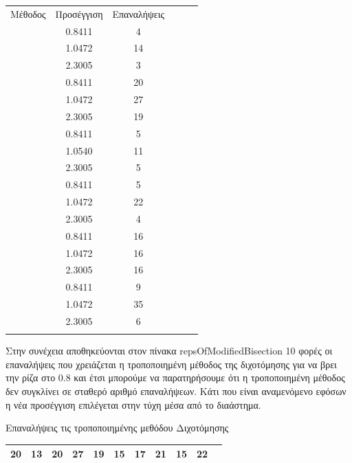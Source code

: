 \documentclass[a4paper,11pt]{article}
\begin{document}
\begin{flushleft}
\begin{center}
    \begin{tabular}{|c|c|c|c|c|c|}
        \hline
        Μέθοδος & Προσέγγιση & Επαναλήψεις\\ \Xhline{4\arrayrulewidth}
        \multirow{3}{*}{modifiedNewtonRoots} & 0.8411 & 4 \\ \cline{2-3} & 1.0472 & 14 \\ \cline{2-3} & 2.3005 & 3 \\ \Xhline{4\arrayrulewidth}
        \multirow{3}{*}{modifiedBisectionRoots} & 0.8411 & 20 \\ \cline{2-3} & 1.0472 & 27 \\ \cline{2-3} & 2.3005 & 19 \\ \Xhline{4\arrayrulewidth}
        \multirow{3}{*}{modifiedSecantRoots} & 0.8411 & 5 \\ \cline{2-3} & 1.0540 & 11 \\ \cline{2-3} & 2.3005 & 5 \\ \Xhline{4\arrayrulewidth}
        \multirow{3}{*}{newtonRoots} & 0.8411 & 5 \\ \cline{2-3} & 1.0472 & 22 \\ \cline{2-3} & 2.3005 & 4 \\ \Xhline{4\arrayrulewidth}
        \multirow{3}{*}{bisectionRoots} & 0.8411 & 16 \\ \cline{2-3} & 1.0472 & 16 \\ \cline{2-3} & 2.3005 & 16 \\ \Xhline{4\arrayrulewidth}
        \multirow{3}{*}{secantRoots} & 0.8411 & 9 \\ \cline{2-3} & 1.0472 & 35 \\ \cline{2-3} & 2.3005 & 6 \\ \Xhline{4\arrayrulewidth}
    \end{tabular}
\end{center}
    
    
    Στην συνέχεια αποθηκεύονται στον πίνακα repsOfModifiedBisection 10 φορές οι επαναλήψεις που χρειάζεται η τροποποιημένη μέθοδος της διχοτόμησης για να βρει την ρίζα στο 0.8 και έτσι μπορούμε να παρατηρήσουμε ότι η τροποποιημένη μέθοδος δεν συγκλίνει σε σταθερό αριθμό επαναλήψεων. Κάτι που είναι αναμενόμενο εφόσων η νέα προσέγγιση επιλέγεται στην τύχη μέσα από το διαάστημα. 
    
\begin{center}
    Επαναλήψεις τις τροποποιημένης μεθόδου Διχοτόμησης
    \begin{tabular}{|c|c|c|c|c|c|c|c|c|c|c|}
        \hline
        20 & 13 & 20 & 27 & 19 & 15 & 17 & 21 & 15 & 22 \\
        \hline
    \end{tabular}
\end{center}


\end{flushleft}
\end{document}
